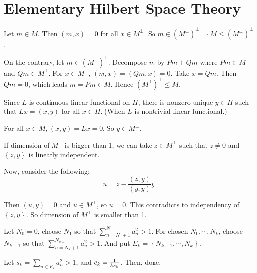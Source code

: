 \setcounter{section}{3}
\section{Elementary Hilbert Space Theory}

\begin{problem}[1]
	\hfill

	Let $m\in M$. Then $\left( m, x \right) = 0 $ for all $x \in M^{\bot}$. So $m \in \left( M^{\bot} \right)^{\bot} \Rightarrow M \leq \left( M^{\bot} \right)^{\bot}$. 

	On the contrary, let $m\in \left( M^{\bot} \right)^{\bot}$. Decompose $m$ by $Pm + Qm$ where $Pm \in M$ and $Qm \in M^{\bot}$. For $x\in M^{\bot}$, $\left( m, x \right) = \left( Qm, x \right) = 0$. Take $x = Qm$. Then $Qm = 0$, which leads $m = Pm \in M$. Hence $\left( M^{\bot} \right)^{\bot} \leq M$. 
\end{problem}

\begin{problem}[5]
	\hfill

	Since $L$ is continuous linear functional on $H$, there is nonzero unique $y\in H$ such that $Lx = \left( x, y \right)$ for all $x \in H$. (When $L$ is nontrivial linear functional.)

	For all $x \in M$, $\left( x, y \right) = Lx = 0$. So $y\in M^{\bot}$. 

	If dimension of $M^{\bot}$ is bigger than 1, we can take $z \in M^{\bot}$ such that $z \ne 0$ and $\left\{ z, y \right\}$ is linearly independent.

	Now, consider the following:
	\begin{equation*}
		u = z - \frac{\left( z, y \right)}{\left( y, y \right)}y
		\label{<+label+>}
	\end{equation*}
	
	Then $\left( u, y \right) = 0$ and $u \in M^{\bot}$, so $u = 0$. This contradicts to independency of $\left\{ z, y \right\}$. So dimension of $M^{\bot}$ is smaller than 1.

\end{problem}

\begin{problem}[7]
	\hfill

	Let $N_0 = 0$, choose $N_1$ so that $\sum_{n=N_0 + 1} ^{N_1} a_n^2 > 1$. 
	For chosen $N_0, \cdots, N_k$, choose $N_{k+1}$ so that $\sum_{n= N_k + 1 }^{N_{k+1}}a_n^2 > 1$. And put $E_k = \left\{ N_{k-1}, \cdots, N_k \right\}$. 

	Let $s_k = \sum_{n\in E_k}a_n^2 >1$, and $c_k ={1\over ks_k}$. Then, done.
	
\end{problem}


